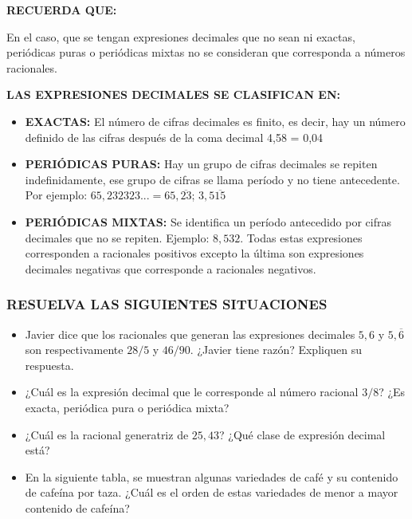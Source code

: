 \documentclass[12pt,a4paper]{article}
\begin{document}
\vspace{1cm}

\begin{tcolorbox}[colback=fondorosa,colframe=rojoclaro,breakable]
\textbf{RECUERDA QUE:}

En el caso, que se tengan expresiones decimales que no sean ni exactas, periódicas puras o periódicas mixtas no se consideran que corresponda a números racionales.

\vspace{0.5cm}

\textbf{LAS EXPRESIONES DECIMALES SE CLASIFICAN EN:}

\begin{itemize}
\item \textbf{EXACTAS:} El número de cifras decimales es finito, es decir, hay un número definido de las cifras después de la coma decimal 4,58 = 0,04

\item \textbf{PERIÓDICAS PURAS:} Hay un grupo de cifras decimales se repiten indefinidamente, ese grupo de cifras se llama período y no tiene antecedente. Por ejemplo: $65,232323... = 65,\overline{23}$; $3,5\overline{15}$

\item \textbf{PERIÓDICAS MIXTAS:} Se identifica un período antecedido por cifras decimales que no se repiten. Ejemplo: $8,532$. Todas estas expresiones corresponden a racionales positivos excepto la última son expresiones decimales negativas que corresponde a racionales negativos.
\end{itemize}
\end{tcolorbox}

\vspace{1cm}

\subsubsection*{RESUELVA LAS SIGUIENTES SITUACIONES}

\begin{itemize}
\item Javier dice que los racionales que generan las expresiones decimales $5,6$ y $5,\overline{6}$ son respectivamente $28/ 5$ y $46/ 90$. ¿Javier tiene razón? Expliquen su respuesta.

\item ¿Cuál es la expresión decimal que le corresponde al número racional $3/8$? ¿Es exacta, periódica pura o periódica mixta?

\item ¿Cuál es la racional generatriz de $25,43$? ¿Qué clase de expresión decimal está?

\item En la siguiente tabla, se muestran algunas variedades de café y su contenido de cafeína por taza. ¿Cuál es el orden de estas variedades de menor a mayor contenido de cafeína?
\end{itemize}
\end{document}
